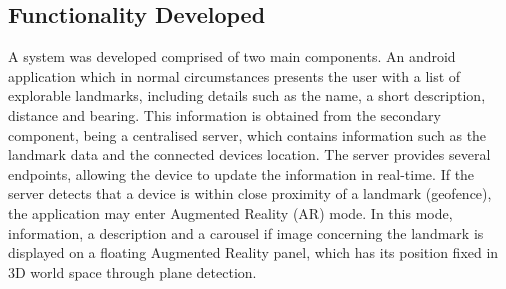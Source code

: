 \subsection{Functionality Developed}
A system was developed comprised of two main components. An android application which in normal circumstances presents the user with a list of explorable landmarks, including 
details such as the name, a short description, distance and bearing. This information is obtained from the secondary component, being a centralised server, which contains information 
such as the landmark data and the connected devices location. The server provides several endpoints, allowing the device to update the information in real-time. If the server detects that 
a device is within close proximity of a landmark (geofence), the application may enter Augmented Reality (AR) mode. In this mode, information, a description and a carousel if image 
concerning the landmark is displayed on a floating Augmented Reality panel, which has its position fixed in 3D world space through plane detection. 
